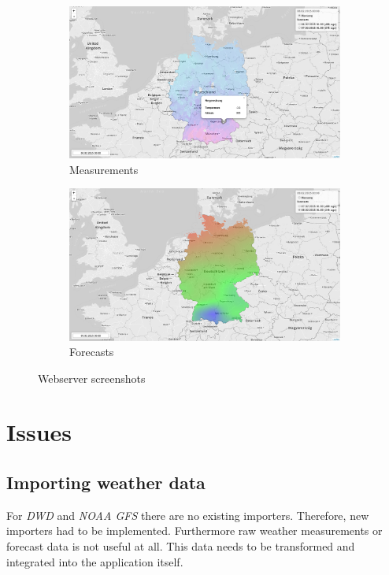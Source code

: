 \documentclass{scrartcl}
\begin{document}
\begin{figure}[h!]
\centering
\begin{subfigure}{.5\textwidth}
  \centering
  \includegraphics[width=.9\linewidth]{../presentation/images/live_measurement.png}
  \caption{Measurements}
\end{subfigure}%
\begin{subfigure}{.5\textwidth}
  \centering
  \includegraphics[width=.9\linewidth]{../presentation/images/live_forecast.png}
  \caption{Forecasts}
\end{subfigure}
\caption{Webserver screenshots}
\end{figure}

\section{Issues}
\subsection{Importing weather data}
For \textit{DWD} and \textit{NOAA GFS} there are no existing importers. Therefore,
new importers had to be implemented. Furthermore raw weather measurements or
forecast data is not useful at all. This data needs to be transformed and
integrated into the application itself.
\end{document}
